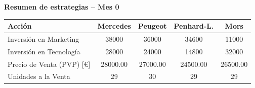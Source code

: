 \documentclass{standalone}
\begin{document}
	\leavevmode %
	
	\begin{minipage}{1.02\linewidth}
		\centering
		
		\textbf{Resumen de estrategias – Mes 0}\\[0.5em]
		\begin{tabular}{@{}l
				S[table-format=5.0]
				S[table-format=5.0]
				S[table-format=5.0]
				S[table-format=5.0]@{}}
			\toprule
			\textbf{Acción} & \textbf{Mercedes} & \textbf{Peugeot} & \textbf{Penhard-L.} & \textbf{Mors} \\
			\midrule
			Inversión en Marketing              & 38000  & 36000  & 34600  & 11000 \\
			Inversión en Tecnología             & 28000  & 24000  & 14800  & 32000 \\
			Precio de Venta (PVP) [\euro]       & 28000.00 & 27000.00 & 24500.00 & 26500.00 \\
			Unidades a la Venta                 & 29     & 30     & 29     & 29 \\
			\bottomrule
		\end{tabular}
	\end{minipage}
	
\end{document}
